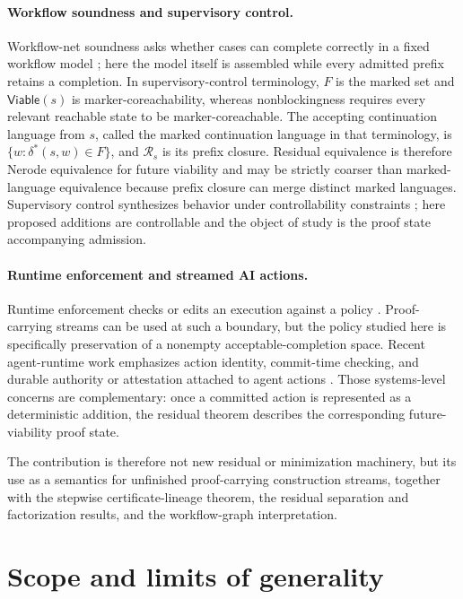 \documentclass[11pt]{article}
\theoremstyle{definition}
\newcommand{\Accept}{F}
\newcommand{\Run}{\delta^{*}}
\newcommand{\Viable}{\mathsf{Viable}}
\newcommand{\Residual}{\mathcal R}
\begin{document}
\paragraph{Workflow soundness and supervisory control.}
Workflow-net soundness asks whether cases can complete correctly in a fixed workflow model \cite{vanderAalst2011}; here the model itself is assembled while every admitted prefix retains a completion. In supervisory-control terminology, $\Accept$ is the marked set and $\Viable(s)$ is marker-coreachability, whereas nonblockingness requires every relevant reachable state to be marker-coreachable. The accepting continuation language from $s$, called the marked continuation language in that terminology, is $\{w:\Run(s,w)\in\Accept\}$, and $\Residual_s$ is its prefix closure. Residual equivalence is therefore Nerode equivalence for future viability and may be strictly coarser than marked-language equivalence because prefix closure can merge distinct marked languages. Supervisory control synthesizes behavior under controllability constraints \cite{ramadge1987,wonham1987}; here proposed additions are controllable and the object of study is the proof state accompanying admission.

\newpage

\paragraph{Runtime enforcement and streamed AI actions.}
Runtime enforcement checks or edits an execution against a policy \cite{schneider2000,ligatti2005,pinisetty2017}. Proof-carrying streams can be used at such a boundary, but the policy studied here is specifically preservation of a nonempty acceptable-completion space. Recent agent-runtime work emphasizes action identity, commit-time checking, and durable authority or attestation attached to agent actions \cite{lilienthal2025,santos2026}. Those systems-level concerns are complementary: once a committed action is represented as a deterministic addition, the residual theorem describes the corresponding future-viability proof state.

The contribution is therefore not new residual or minimization machinery, but its use as a semantics for unfinished proof-carrying construction streams, together with the stepwise certificate-lineage theorem, the residual separation and factorization results, and the workflow-graph interpretation.

\section{Scope and limits of generality}\label{sec:scope}
\end{document}
